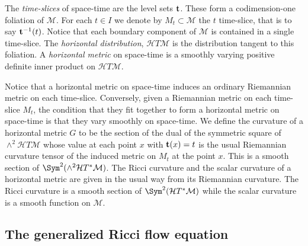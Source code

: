 \begin{definition}\label{def:time-slices-horizontal}
\leanok

The {\em time-slices}
of space-time are the level sets ${\bf t}$. These form a
codimension-one foliation of ${\mathcal M}$. For each $t\in I$ we
denote by $M_t\subset {\mathcal M}$ the $t$ time-slice, that is to
say ${\bf t}^{-1}(t)$. Notice that each boundary component of
${\mathcal M}$ is contained in a single time-slice. The {\em
horizontal distribution}, ${\mathcal H}T{\mathcal M}$ is the
distribution tangent to this foliation. A {\em horizontal
metric} on
space-time is a smoothly varying positive definite inner product on
${\mathcal H}T{\mathcal M}$.
\end{definition}

Notice that a horizontal metric on space-time induces an ordinary
Riemannian metric on each time-slice. Conversely, given a Riemannian
metric on each time-slice $M_t$, the condition that they fit
together to form a horizontal metric on space-time is that they vary
smoothly on space-time. We define the curvature of a horizontal
metric $G$ to be the section of the dual of the symmetric square of
$\wedge^2{\mathcal H}T{\mathcal M}$ whose value at each point $x$ with ${\bf
t}(x)=t$ is the usual Riemannian curvature tensor of the induced
metric on $M_t$  at the point $x$. This is a smooth section of $\Sym^2(\wedge^2{\mathcal H}T^*{\mathcal M})$.
 The Ricci curvature and the scalar curvature of a horizontal metric
 are given in the usual way from its Riemannian curvature.
 The Ricci curvature is a smooth section of $\Sym^2({\mathcal
 H}T^*{\mathcal M})$ while the scalar curvature is a smooth function on ${\mathcal M}$.

\subsection{The generalized Ricci flow equation}



